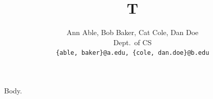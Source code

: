 \documentclass{article}
\title{T}
\author{Ann Able, Bob Baker, Cat Cole, Dan Doe\\ Dept.\ of CS\\
  \texttt{\{able, baker\}@a.edu, \texttt{\{cole, dan.doe\}@b.edu}}}
\begin{document}
\maketitle
Body.
\end{document}
